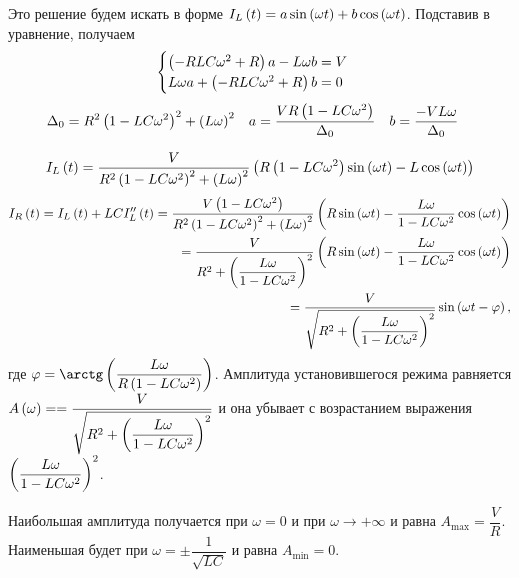 \documentclass[a5paper,10pt]{article}
\begin{document}
Это решение будем искать в форме $I_{L}\left(t\right) = a \sin\left(\omega t\right) + b \cos\left(\omega t\right)$. Подставив в уравнение, получаем
$$\begin{cases}
        \left(-RLC\omega^2 + R\right) a - L\omega b = V \\
        L\omega a + \left(-RLC\omega^2 + R\right) b = 0
    \end{cases}$$
\begin{align*}
    \Delta_{0} = R^2\left(1 - LC\omega^2\right)^2 + \left(L\omega\right)^2 &&
    a = \frac {VR\left(1 - LC\omega^2\right)} {\Delta_{0}} &&
    b = \frac {-VL\omega} {\Delta_{0}} &&
\end{align*}

$$I_{L}\left(t\right) = \frac{V}{R^2\left(1 - LC\omega^2\right)^2 + \left(L\omega\right)^2} \left(R\left(1 - LC\omega^2\right) \sin\left(\omega t\right) - L \cos\left(\omega t\right)\right)$$
\begin{equation*}
    \begin{split}
        I_{R}\left(t\right) = I_{L}\left(t\right) + LCI''_{L}\left(t\right) = \frac {V\left(1 - LC\omega^2\right)} {R^2\left(1 - LC\omega^2\right)^2 + \left(L\omega\right)^2} \left(R \sin\left(\omega t\right) - \frac {L\omega} {1 - LC\omega^2} \cos\left(\omega t\right)\right) & \\
        = \frac {V} {R^2 + \left(\dfrac {L\omega}{1 - LC\omega^2}\right)^2} \left(R \sin\left(\omega t\right) - \frac {L\omega} {1 - LC\omega^2} \cos\left(\omega t\right)\right) & \\
        = \frac {V} {\sqrt{R^2 + \left(\dfrac {L\omega}{1 - LC\omega^2}\right)^2}} \sin\left(\omega t - \varphi\right),
    \end{split}
\end{equation*}
где $\phi = \arctg\br{\dfrac{L\omega}{R\br{1 - LC\omega^2}}}$.
Амплитуда установившегося режима равняется $A\br{\omega} = \linebreak = \dfrac {V} {\sqrt{R^2 + \br{\dfrac {L\omega}{1 - LC\omega^2}}^2}}$ и она убывает с возрастанием выражения $\left(\dfrac {L\omega}{1 - LC\omega^2}\right)^2$.

Наибольшая амплитуда получается при $\omega = 0$ и при $\omega \to +\infty$ и равна $A_{\max} = \dfrac{V}{R}$. Наименьшая будет при $\omega = \pm \dfrac {1} {\sqrt{LC}}$ и равна $A_{\min} = 0$.
\end{document}
